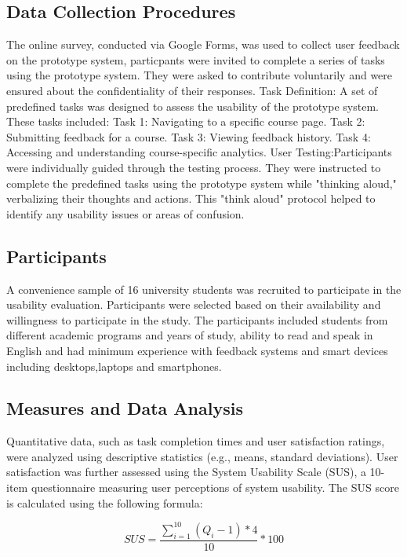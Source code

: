\documentclass[conference]{IEEEtran}
\begin{document}
\subsection{Data Collection Procedures}
The online survey, conducted via Google Forms, was used to collect user feedback on the prototype system, particpants were invited to complete a series of tasks using the prototype system. They were asked to contribute voluntarily and were ensured about the confidentiality of their responses.
Task Definition: A set of predefined tasks was designed to assess the usability of the prototype system. These tasks included:
     Task 1: Navigating to a specific course page.
    Task 2: Submitting feedback for a course.
     Task 3: Viewing feedback history.
     Task 4: Accessing and understanding course-specific analytics. 
User Testing:Participants were individually guided through the testing process. They were instructed to complete the predefined tasks using the prototype system while "thinking aloud," verbalizing their thoughts and actions. This "think aloud" protocol helped to identify any usability issues or areas of confusion.


\subsection{Participants}
A convenience sample of 16 university students was recruited to participate in the usability evaluation. Participants were selected based on their availability and willingness to participate in the study. The participants included students from different academic programs and years of study, ability to read and speak in English and had minimum experience with feedback systems and smart devices including desktops,laptops and smartphones.

\subsection{Measures and Data Analysis}
Quantitative data, such as task completion times and user satisfaction ratings, were analyzed using descriptive statistics (e.g., means, standard deviations). User satisfaction was further assessed using the System Usability Scale (SUS), a 10-item questionnaire measuring user perceptions of system usability. The SUS score is calculated using the following formula:

\begin{equation*}
SUS = \frac{\sum_{i=1}^{10} (Q_i - 1) * 4}{10} * 100
\end{equation*}
\end{document}
